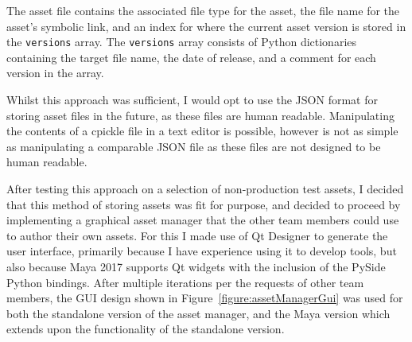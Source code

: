 \documentclass[11pt]{article}
\begin{document}
The asset file contains the associated file type for the asset, the file name for the asset's symbolic link, and an index for where the current asset version is stored in the \texttt{versions} array. The \texttt{versions} array consists of Python dictionaries containing the target file name, the date of release, and a comment for each version in the array.

Whilst this approach was sufficient, I would opt to use the JSON format for storing asset files in the future, as these files are human readable. Manipulating the contents of a cpickle file in a text editor is possible, however is not as simple as manipulating a comparable JSON file as these files are not designed to be human readable.

After testing this approach on a selection of non-production test assets, I decided that this method of storing assets was fit for purpose, and decided to proceed by implementing a graphical asset manager that the other team members could use to author their own assets. For this I made use of Qt Designer to generate the user interface, primarily because I have experience using it to develop tools, but also because Maya 2017 supports Qt widgets with the inclusion of the PySide Python bindings. After multiple iterations per the requests of other team members, the GUI design shown in Figure~\ref{figure:assetManagerGui} was used for both the standalone version of the asset manager, and the Maya version which extends upon the functionality of the standalone version.
\end{document}
